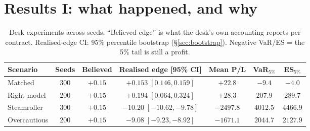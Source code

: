 \documentclass[11pt,a4paper]{article}
\begin{document}
\section{Results I: what happened, and why}
\label{sec:deskresults}

\begin{table}[h]
\centering\small
\caption{Desk experiments across seeds. ``Believed edge'' is what the desk's own
accounting reports per contract. Realised-edge CI: 95\% percentile bootstrap
(\S\ref{sec:bootstrap}). Negative VaR/ES = the 5\% tail is still a profit.}
\label{tab:desk}
\begin{tabular}{lcccccc}
\toprule
Scenario & Seeds & Believed & Realised edge [95\% CI] & Mean P/L &
VaR$_{5\%}$ & ES$_{5\%}$\\
\midrule
Matched & 300 & $+0.15$ & $+0.153\;[0.146,0.159]$ & $+22.8$ & $-9.4$ & $-4.0$\\
Right model & 200 & $+0.15$ & $+0.194\;[0.064,0.324]$ & $+28.3$ & $207.9$ & $289.7$\\
Steamroller & 300 & $+0.15$ & $-10.20\;[-10.62,-9.78]$ & $-2497.8$ & $4012.5$ & $4466.9$\\
Overcautious & 200 & $+0.15$ & $-9.08\;[-9.23,-8.92]$ & $-1671.1$ & $2044.7$ & $2127.9$\\
\bottomrule
\end{tabular}
\end{table}
\end{document}
